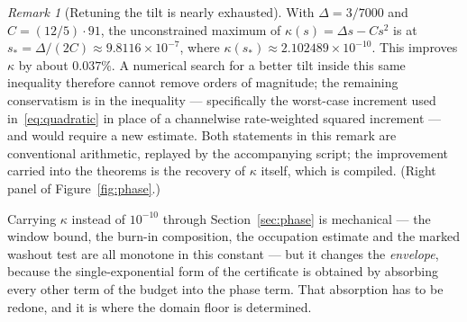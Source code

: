 \documentclass[11pt,a4paper]{article}
\theoremstyle{plain}
\theoremstyle{definition}
\theoremstyle{remark}
\newtheorem{remark}[theorem]{Remark}
\begin{document}
\begin{remark}[Retuning the tilt is nearly exhausted]\label{rem:tilt}
With $\Delta=3/7000$ and $C=(12/5)\cdot91$, the unconstrained maximum of $\kappa(s)=\Delta s-Cs^2$ is at $s_\ast=\Delta/(2C)\approx9.8116\times10^{-7}$, where $\kappa(s_\ast)\approx2.102489\times10^{-10}$. This improves $\kappa$ by about $0.037\%$. A numerical search for a better tilt inside this same inequality therefore cannot remove orders of magnitude; the remaining conservatism is in the inequality --- specifically the worst-case increment used in~\eqref{eq:quadratic} in place of a channelwise rate-weighted squared increment --- and would require a new estimate. Both statements in this remark are conventional arithmetic, replayed by the accompanying script; the improvement carried into the theorems is the recovery of $\kappa$ itself, which is compiled. (Right panel of Figure~\ref{fig:phase}.)
\end{remark}

Carrying $\kappa$ instead of $10^{-10}$ through Section~\ref{sec:phase} is mechanical --- the window bound, the burn-in composition, the occupation estimate and the marked washout test are all monotone in this constant --- but it changes the \emph{envelope}, because the single-exponential form of the certificate is obtained by absorbing every other term of the budget into the phase term. That absorption has to be redone, and it is where the domain floor is determined.
\end{document}
